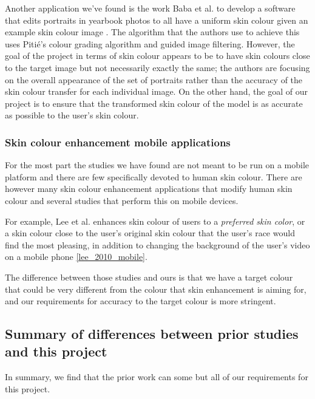 Another application we've found is the work Baba et al. to develop a software that edits portraits in yearbook photos to all have a uniform skin colour given an example skin colour image \cite{baba_2015_yearbook}. The algorithm that the authors use to achieve this uses Pitié's colour grading algorithm and guided image filtering. However, the goal of the project in terms of skin colour appears to be to have skin colours close to the target image but not necessarily exactly the same; the authors are focusing on the overall appearance of the set of portraits rather than the accuracy of the skin colour transfer for each individual image. On the other hand, the goal of our project is to ensure that the transformed skin colour of the model is as accurate as possible to the user's skin colour.

\subsubsection{Skin colour enhancement mobile applications}
For the most part the studies we have found are not meant to be run on a mobile platform and there are few specifically devoted to human skin colour. There are however many skin colour enhancement applications that modify human skin colour and several studies that perform this on mobile devices.

For example, Lee et al. enhances skin colour of users to a \textit{preferred skin color}, or a skin colour close to the user's original skin colour that the user's race would find the most pleasing, in addition to changing the background of the user's video on a mobile phone \ref{lee_2010_mobile}. 

The difference between those studies and ours is that we have a target colour that could be very different from the colour that skin enhancement is aiming for, and our requirements for accuracy to the target colour is more stringent.

\subsection{Summary of differences between prior studies and this project}
In summary, we find that the prior work can some but all of our requirements for this project.
